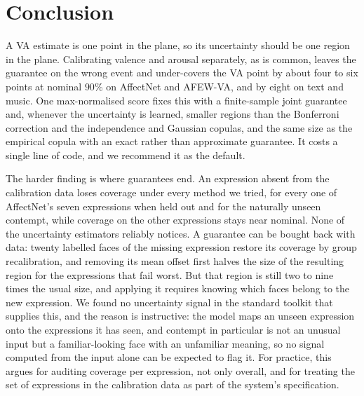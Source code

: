 \section{Conclusion}

A VA estimate is one point in the plane, so its uncertainty should be one region
in the plane. Calibrating valence and arousal separately, as is common, leaves
the guarantee on the wrong event and under-covers the VA point by about
four to six points at nominal $90\%$ on AffectNet and AFEW-VA, and by eight
on text and music. One
max-normalised score fixes this with a finite-sample joint guarantee and,
whenever the uncertainty is learned, smaller regions than the Bonferroni
correction and the independence and Gaussian copulas, and the same size as the
empirical copula with an exact rather than approximate guarantee. It costs a
single line of code, and we recommend it as the default.

The harder finding is where guarantees end. An expression absent from the
calibration data loses coverage under every method we tried, for every one of
AffectNet's seven expressions when held out and for the naturally unseen
contempt, while coverage on the other expressions stays near nominal. None of the
uncertainty estimators reliably notices. A guarantee can be bought back with
data: twenty labelled faces of the missing expression restore its coverage by
group recalibration, and removing its mean offset first halves the size of the
resulting region for the expressions that fail worst. But that region is still
two to nine times the usual size, and applying it requires knowing which faces
belong to the new expression. We found no uncertainty signal in the standard
toolkit that supplies this, and the reason is
instructive: the model maps an unseen expression onto the expressions it has
seen, and contempt in particular is not an unusual input but a familiar-looking
face with an unfamiliar meaning, so no signal computed from the input alone can
be expected to flag it. For practice, this argues for auditing coverage per
expression, not only overall, and for treating the set of expressions in the
calibration data as part of the system's specification.

